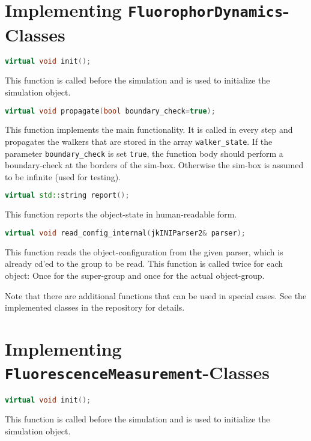 \section{Implementing \texttt{FluorophorDynamics}-Classes}
\label{sec:ImplementingTextttFluorophorDynamicsClasses}

\begin{lstlisting}[language=c++] 
	virtual void init();
\end{lstlisting}
This function is called before the simulation and is used to initialize the simulation object.


\begin{lstlisting}[language=c++] 
	virtual void propagate(bool boundary_check=true);
\end{lstlisting}	
This function implements the main functionality. It is called in every step and propagates the walkers that are stored in the array \texttt{walker\_state}. If the parameter \texttt{boundary\_check} is set \texttt{true}, the function body should perform a boundary-check at the borders of the sim-box. Otherwise the sim-box is assumed to be infinite (used for testing).

\begin{lstlisting}[language=c++] 
	virtual std::string report();
\end{lstlisting}	
This function reports the object-state in human-readable form.


\begin{lstlisting}[language=c++] 
	virtual void read_config_internal(jkINIParser2& parser);
\end{lstlisting}	
This function reads the object-configuration from the given parser, which is already cd'ed to the group to be read. This function is called twice for each object: Once for the super-group and once for the actual object-group.

Note that there are additional functions that can be used in special cases. See the implemented classes in the repository for details.

\section{Implementing \texttt{FluorescenceMeasurement}-Classes}
\label{sec:ImplementingTextttFluorescenceMeasurementClasses}
\begin{lstlisting}[language=c++] 
	virtual void init();
\end{lstlisting}
This function is called before the simulation and is used to initialize the simulation object.


